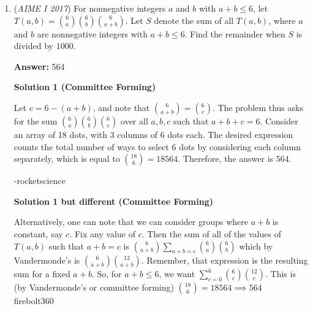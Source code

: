 \begin{enumerate}
 
 \[2a+b=1\]
 \[2a^2+4ab=\frac{14}{25}\]
 \[2a^2+b^2=\frac{11}{25}\]

 Notice we are denoting $a$ and $b$ as our probabilities, which we will be converting to degrees later. The 2 remaining systems can be calculated by using our rule about intersecting arcs and chords. So, after some hairy algebra we get: 

 
 \[a=\frac{1}{5}\] if 
 \[b=\frac{3}{5}\]
 \[a=\frac{7}{15}\] if 
 \[b=\frac{1}{15}\]

 From here we find the absolute difference by doing $\frac{7}{15}-\frac{1}{5} = \frac{4}{15}$. Converting to degrees, since the angles of a triangle add up to $180^o$, we find that $\frac{4}{15} \cdot 180 =\boxed{048}$, which is our answer.

 -Geometry285

 


	\item (\textit{AIME I 2017}) For nonnegative integers $a$ and $b$ with  $a + b \leq 6$, let $T(a, b) = \binom{6}{a} \binom{6}{b} \binom{6}{a + b}$. Let $S$ denote the sum of all $T(a, b)$, where  $a$ and $b$ are nonnegative integers with $a + b \leq 6$. Find the remainder when $S$ is divided by $1000$.


 
 \textbf{Answer: }564



\textbf{Solution 1 (Committee Forming)}

Let $c=6-(a+b)$, and note that $\binom{6}{a + b}=\binom{6}{c}$. The problem thus asks for the sum $\binom{6}{a} \binom{6}{b} \binom{6}{c}$ over all $a,b,c$ such that $a+b+c=6$. Consider an array of 18 dots, with 3 columns of 6 dots each. The desired expression counts the total number of ways to select 6 dots by considering each column separately, which is equal to $\binom{18}{6}=18564$. Therefore, the answer is $\boxed{564}$.

 -rocketscience

 



\textbf{Solution 1 but different (Committee Forming)}

Alternatively, one can note that we can consider groups where $a+b$ is constant, say $c$. Fix any value of $c$. Then the sum of all of the values of $T(a,b)$ such that $a+b=c$ is $\binom{6}{a+b} \sum_{a+b=c} \binom{6}{a}\binom{6}{b}$ which by Vandermonde's is $\binom{6}{a+b}\binom{12}{a+b}$. Remember, that expression is the resulting sum for a fixed $a+b$. So, for $a+b\le 6$, we want $\sum_{c=0}^{6} \binom{6}{c}\binom{12}{c}$. This is (by Vandermonde's or committee forming) $\binom{18}{6} = 18564 \implies \boxed{564}$ ~ firebolt360


\end{enumerate}
